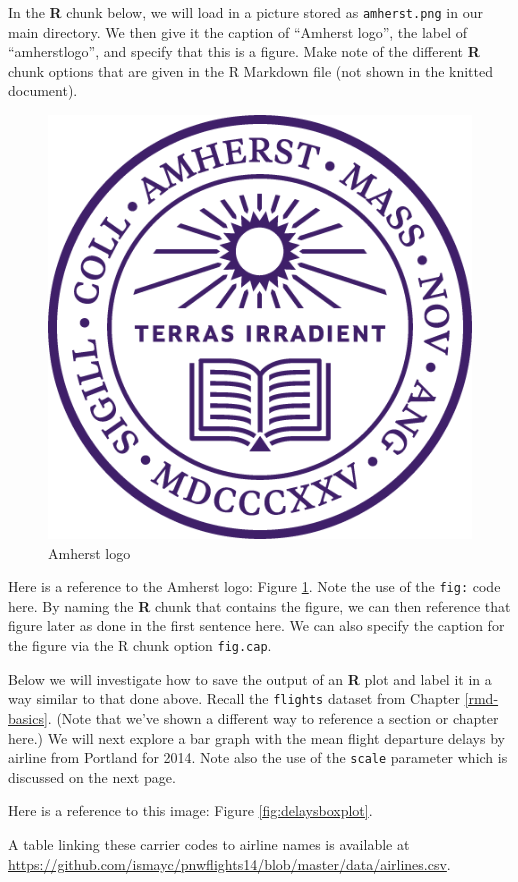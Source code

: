 \documentclass[12pt, twoside]{amherstthesis}
\begin{document}
In the \textbf{R} chunk below, we will load in a picture stored as \texttt{amherst.png} in our main directory. We then give it the caption of ``Amherst logo'', the label of ``amherstlogo'', and specify that this is a figure. Make note of the different \textbf{R} chunk options that are given in the R Markdown file (not shown in the knitted document).
\begin{figure}

{\centering \includegraphics[width=0.5\linewidth]{figures/amherst} 

}

\caption{Amherst logo}\label{fig:amherstlogo}
\end{figure}
Here is a reference to the Amherst logo: Figure \ref{fig:amherstlogo}. Note the use of the \texttt{fig:} code here. By naming the \textbf{R} chunk that contains the figure, we can then reference that figure later as done in the first sentence here. We can also specify the caption for the figure via the R chunk option \texttt{fig.cap}.

\clearpage

Below we will investigate how to save the output of an \textbf{R} plot and label it in a way similar to that done above. Recall the \texttt{flights} dataset from Chapter \ref{rmd-basics}. (Note that we've shown a different way to reference a section or chapter here.) We will next explore a bar graph with the mean flight departure delays by airline from Portland for 2014. Note also the use of the \texttt{scale} parameter which is discussed on the next page.

Here is a reference to this image: Figure \ref{fig:delaysboxplot}.

A table linking these carrier codes to airline names is available at \url{https://github.com/ismayc/pnwflights14/blob/master/data/airlines.csv}.

\clearpage
\end{document}
